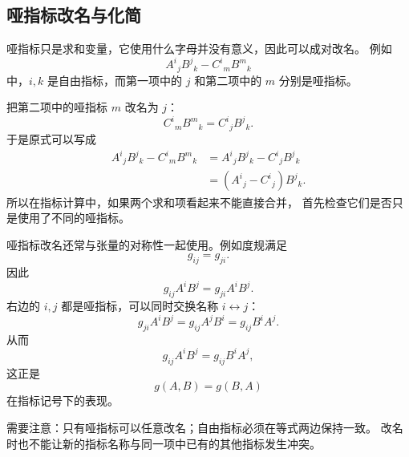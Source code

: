 \documentclass[UTF8,11pt,a4paper,fontset=fandol]{ctexart}
\numberwithin{equation}{section}
\begin{document}
\subsection{哑指标改名与化简}

哑指标只是求和变量，它使用什么字母并没有意义，因此可以成对改名。
例如
\[
A^i{}_jB^j{}_k-C^i{}_mB^m{}_k
\]
中，$i,k$ 是自由指标，而第一项中的 $j$ 和第二项中的 $m$
分别是哑指标。

把第二项中的哑指标 $m$ 改名为 $j$：
\[
C^i{}_mB^m{}_k
=
C^i{}_jB^j{}_k.
\]
于是原式可以写成
\[
\begin{aligned}
A^i{}_jB^j{}_k-C^i{}_mB^m{}_k
&=A^i{}_jB^j{}_k-C^i{}_jB^j{}_k\\
&=(A^i{}_j-C^i{}_j)B^j{}_k.
\end{aligned}
\]
所以在指标计算中，如果两个求和项看起来不能直接合并，
首先检查它们是否只是使用了不同的哑指标。

哑指标改名还常与张量的对称性一起使用。例如度规满足
\[
g_{ij}=g_{ji}.
\]
因此
\[
g_{ij}A^iB^j
=
g_{ji}A^iB^j.
\]
右边的 $i,j$ 都是哑指标，可以同时交换名称 $i\leftrightarrow j$：
\[
g_{ji}A^iB^j
=
g_{ij}A^jB^i
=
g_{ij}B^iA^j.
\]
从而
\[
g_{ij}A^iB^j
=
g_{ij}B^iA^j,
\]
这正是
\[
g(A,B)=g(B,A)
\]
在指标记号下的表现。

需要注意：只有哑指标可以任意改名；自由指标必须在等式两边保持一致。
改名时也不能让新的指标名称与同一项中已有的其他指标发生冲突。
\end{document}
